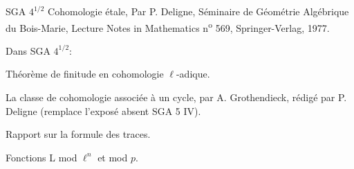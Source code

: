 \documentclass[11pt]{article}
\begin{document}
SGA $4^{1/2}$ Cohomologie étale, Par P. Deligne, Séminaire de Géométrie Algébrique du Bois-Marie, Lecture Notes in Mathematics n\textsuperscript{o} 569, Springer-Verlag, 1977.

Dans SGA $4^{1/2}$:
\begin{description}[leftmargin=3.5em]
\item[Finitude:] Théorème de finitude en cohomologie $\ell$-adique.
\item[Cycle:] La classe de cohomologie associée à un cycle, par A. Grothendieck, rédigé par P. Deligne (remplace l'exposé absent SGA 5 IV).
\item[Rapport:] Rapport sur la formule des traces.
\item[Fonctions L:] Fonctions L mod $\ell^n$ et mod $p$.
\end{description}
\end{document}
